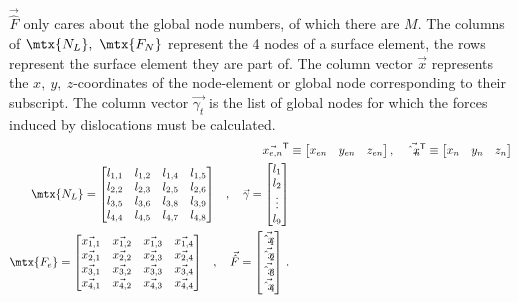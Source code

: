 $ \vec{\hat{F}} $ only cares about the global node numbers, of which there are $ M $. The columns of $ \mtx{N_{L}},~ \mtx{F_{N}} $ represent the 4 nodes of a surface element, the rows represent the surface element they are part of. The column vector $ \vec{x} $ represents the $ x,~y,~z$-coordinates of the node-element or global node corresponding to their subscript. The column vector $ \vec{\gamma_{t}} $ is the list of global nodes for which the forces induced by dislocations must be calculated.
\begin{align}
	\vec{x_{e,n}}^{\mathsf{T}} & \equiv	\begin{bmatrix}
		x_{en} & y_{en} & z_{en}
	\end{bmatrix}, \quad
	\vec{\hat{x}_{n}}^{\mathsf{T}} \equiv	\begin{bmatrix}
		x_{n} & y_{n} & z_{n}
	\end{bmatrix}      \\
	\begin{split}
		\mtx{N_{L}} &=	\begin{bmatrix}
			l_{1,1} & l_{1,2} & l_{1,4} & l_{1,5} \\
			l_{2,2} & l_{2,3} & l_{2,5} & l_{2,6} \\
			l_{3,5} & l_{3,6} & l_{3,8} & l_{3,9} \\
			l_{4,4} & l_{4,5} & l_{4,7} & l_{4,8} \\
		\end{bmatrix}
	\end{split}
	, \quad
	\vec{\gamma} =   \begin{bmatrix}
		l_1    \\
		l_2    \\
		\vdots \\
		l_9
	\end{bmatrix}                          \\
	\begin{split}
		\mtx{F_{e}} &=	\begin{bmatrix}
			\vec{x_{1,1}} & \vec{x_{1,2}} & \vec{x_{1,3}} & \vec{x_{1,4}} \\
			\vec{x_{2,1}} & \vec{x_{2,2}} & \vec{x_{2,3}} & \vec{x_{2,4}} \\
			\vec{x_{3,1}} & \vec{x_{3,2}} & \vec{x_{3,3}} & \vec{x_{3,4}} \\
			\vec{x_{4,1}} & \vec{x_{4,2}} & \vec{x_{4,3}} & \vec{x_{4,4}} \\
		\end{bmatrix}
	\end{split}
	,\quad
	\vec{\hat{F}} = 	\begin{bmatrix}
		\vec{\hat{x}_{1}} \\
		\vec{\hat{x}_{2}} \\
		\vec{\hat{x}_{3}} \\
		\vec{\hat{x}_{4}}
	\end{bmatrix}\,.\label{eq:force_imp}
\end{align}

